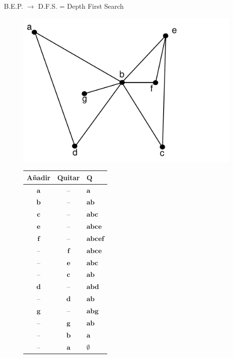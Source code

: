 \documentclass[ebook,oneside]{memoir}
\newcommand{\bolds}[1]{\boldsymbol{#1}}
\begin{document}
\vspace{0.4cm}
        B.E.P. $\rightarrow$ D.F.S. = Depth First Search
\vspace{0.4cm}

        \begin{center}
        \begin{figure}[h!]\centering
        \includegraphics[scale=0.2]{B2.pdf}
        \begin{minipage}{.4\textwidth}\begin{tabular}{|ccl|} \hline
            A\~nadir & Quitar & $\bolds{Q}$ \\ \hline
            $\bolds{a}$ & -- & $\bolds{a}$ \\
            $\bolds{b}$ & -- & $\bolds{ab}$ \\
            $\bolds{c}$ & -- & $\bolds{abc}$ \\
            $\bolds{e}$ & -- & $\bolds{abce}$ \\
            $\bolds{f}$ & -- & $\bolds{abcef}$ \\
            -- & $\bolds{f}$ & $\bolds{abce}$ \\
            -- & $\bolds{e}$ & $\bolds{abc}$ \\
            -- & $\bolds{c}$ & $\bolds{ab}$ \\
            $\bolds{d}$ & -- & $\bolds{abd}$ \\
            -- & $\bolds{d}$ & $\bolds{ab}$ \\
            $\bolds{g}$ & -- & $\bolds{abg}$ \\
            -- & $\bolds{g}$ & $\bolds{ab}$ \\
            -- & $\bolds{b}$ & $\bolds{a}$ \\
            -- & $\bolds{a}$ & $\bolds{\emptyset}$ \\ \hline
        \end{tabular}\end{minipage}
        \end{figure}
        \end{center}
\end{document}
